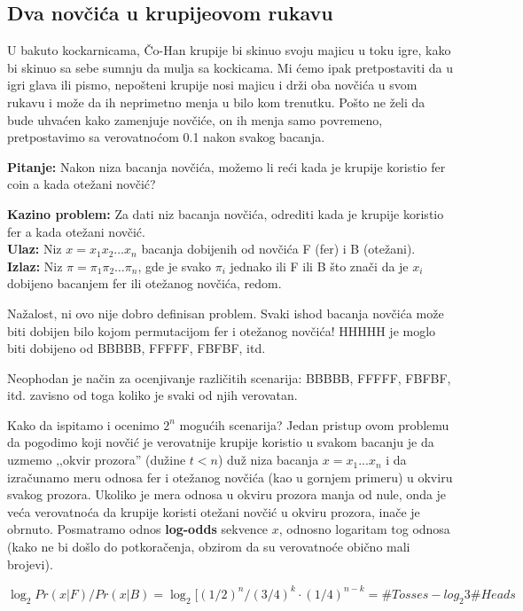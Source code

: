 \subsection{Dva novčića u krupijeovom rukavu}
U bakuto kockarnicama, Čo-Han krupije bi skinuo svoju majicu u toku igre, kako bi skinuo sa sebe sumnju da mulja sa kockicama. Mi ćemo ipak pretpostaviti da u igri glava ili pismo, nepošteni krupije nosi majicu i drži oba novčića u svom rukavu i može da ih neprimetno menja u bilo kom trenutku. Pošto ne želi da bude uhvaćen kako zamenjuje novčiće, on ih menja samo povremeno, pretpostavimo sa verovatnoćom 0.1 nakon svakog bacanja. 

\textbf{Pitanje:} Nakon niza bacanja novčića, možemo
li reći kada je krupije koristio fer coin a
kada otežani novčić?

\begin{tcolorbox}\textbf{Kazino problem:}
Za dati niz bacanja novčića, odrediti kada je krupije koristio fer a kada otežani novčić. \\
\textbf{Ulaz:} Niz $ x = x_1 x_2 \ldots x_n $ bacanja dobijenih od novčića F (fer) i B (otežani). \\
\textbf{Izlaz:} Niz $ \pi = \pi_1 \pi_2 \ldots \pi_n $, gde je svako $ \pi_i $
jednako ili F ili B što znači da je $ x_i $ dobijeno bacanjem fer ili otežanog novčića, redom.
\end{tcolorbox}

Nažalost, ni ovo nije dobro definisan problem. Svaki ishod bacanja novčića može biti dobijen bilo kojom permutacijom fer i
otežanog novčića! HHHHH je moglo biti dobijeno od BBBBB,
FFFFF, FBFBF, itd.

Neophodan je način za ocenjivanje različitih scenarija: BBBBB, FFFFF,
FBFBF, itd. zavisno od toga koliko je svaki od njih verovatan.

Kako da ispitamo i ocenimo $ 2^n $ mogućih scenarija? Jedan pristup ovom problemu da pogodimo koji novčić je verovatnije krupije koristio u svakom bacanju je da uzmemo ‚‚okvir prozora'' (dužine $ t < n $) duž niza bacanja $ x = x_1...x_n $ i da izračunamo meru odnosa fer i otežanog novčića (kao u gornjem primeru) u okviru svakog prozora. Ukoliko je mera odnosa u okviru prozora manja od nule, onda je veća verovatnoća da krupije koristi otežani novčić u okviru prozora, inače je obrnuto.  Posmatramo odnos \textbf{log-odds} sekvence $x$, odnosno logaritam tog odnosa (kako ne bi došlo do potkoračenja, obzirom da su verovatnoće obično mali brojevi). 

$$\log_2Pr(x|F) / Pr(x|B) = \log_2 [(1/2)^n / (3/4)^k \cdot (1/4)^{n-k} = \#Tosses - log_2 3 \#Heads$$


